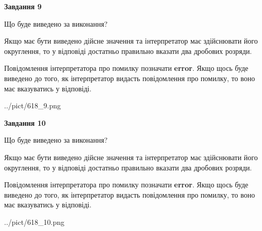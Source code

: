 \documentclass[12pt, ukrainian]{article}
\begin{document}
{\begin {Large}
{\begin {center}\textbf{Завдання 9}\end {center}}\par
Що буде виведено за виконання? \par

Якщо має бути виведено дійсне значення та інтерпретатор має здійснювати його округлення, 
то у відповіді достатньо правильно вказати два дробових розряди.

Повідомлення інтерпретатора про помилку позначати \textbf{error}.
Якщо щось буде виведено до того, як інтерпретатор видасть повідомлення про помилку, 
то воно має вказуватись у відповіді. \par

\begin{center}
	{../pict/618_9.png}
\end{center}
\newpage

{\begin {center}\textbf{Завдання 10}\end {center}}\par
Що буде виведено за виконання? \par

Якщо має бути виведено дійсне значення та інтерпретатор має здійснювати його округлення, 
то у відповіді достатньо правильно вказати два дробових розряди.

Повідомлення інтерпретатора про помилку позначати \textbf{error}.
Якщо щось буде виведено до того, як інтерпретатор видасть повідомлення про помилку, 
то воно має вказуватись у відповіді. \par

\begin{center}
	{../pict/618_10.png}
\end{center}
\newpage

\end {Large}}
\end{document}
